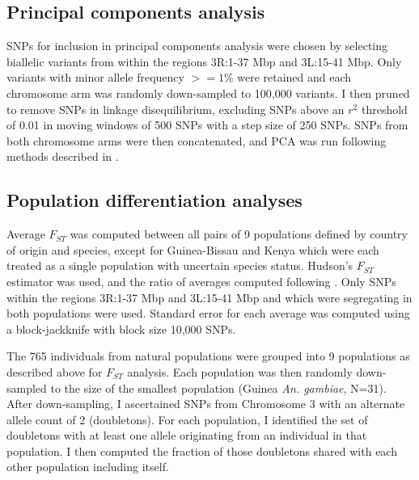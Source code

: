 \documentclass[a4paper,11pt,abstracton,hidelinks]{scrartcl}
\begin{document}
\subsection{Principal components analysis}\label{subsec:methods-pca}


SNPs for inclusion in principal components analysis were chosen by selecting biallelic variants from within the regions 3R:1-37 Mbp and 3L:15-41 Mbp.
%
Only variants with minor allele frequency $>=1\%$ were retained and each chromosome arm was randomly down-sampled to 100,000 variants.
%
I then pruned to remove SNPs in linkage disequilibrium, excluding SNPs above an $r^2$ threshold of 0.01 in moving windows of 500 SNPs with a step size of 250 SNPs.
%
SNPs from both chromosome arms were then concatenated, and PCA was run following methods described in \textcite{Patterson2006}.


\subsection{Population differentiation analyses}\label{subsec:methods-popdiff}


Average $F_{ST}$ was computed between all pairs of 9 populations defined by country of origin and species, except for Guinea-Bissau and Kenya which were each treated as a single population with uncertain species status.
%
Hudson's $F_{ST}$ estimator was used, and the ratio of averages computed following \textcite{Bhatia2013}.
%
Only SNPs within the regions 3R:1-37 Mbp and 3L:15-41 Mbp and which were segregating in both populations were used.
%
Standard error for each average was computed using a block-jackknife with block size 10,000 SNPs.


The 765 individuals from natural populations were grouped into 9 populations as described above for $F_{ST}$ analysis.
%
Each population was then randomly down-sampled to the size of the smallest population (Guinea \textit{An. gambiae}, N=31).
%
After down-sampling, I ascertained SNPs from Chromosome 3 with an alternate allele count of 2 (doubletons).
%
For each population, I identified the set of doubletons with at least one allele originating from an individual in that population.
%
I then computed the fraction of those doubletons shared with each other population including itself.
\end{document}
